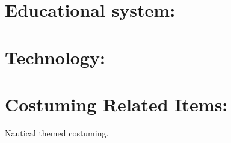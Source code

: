 \documentclass[blue]{GL2020}
\begin{document}
\section{Educational system:}

\section{Technology:}

\section{Costuming Related Items:}
Nautical themed costuming.

\end{document}
